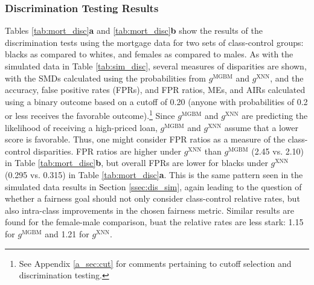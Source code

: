 \documentclass[information,article,submit,moreauthors,pdftex]{definitions/mdpi}
\begin{document}
\subsubsection{Discrimination Testing Results}\label{ssec:dis_mort}

Tables \ref{tab:mort_disc}\textbf{a} and \ref{tab:mort_disc}\textbf{b} show the results of the discrimination tests using the mortgage data for two sets of class-control groups: blacks as compared to whites, and females as compared to males. As with the simulated data in Table \ref{tab:sim_disc}, several measures of disparities are shown, with the SMDs calculated using the probabilities from $g^{\text{MGBM}}$ and $g^{\text{XNN}}$, and the accuracy, false positive rates (FPRs), and  FPR ratios, MEs, and AIRs calculated using a binary outcome based on a cutoff of 0.20 (anyone with probabilities of 0.2 or less receives the favorable outcome).\footnote{See Appendix \ref{a_sec:cut} for comments pertaining to cutoff selection and discrimination testing.} Since $g^{\text{MGBM}}$ and $g^{\text{XNN}}$  are predicting the likelihood of receiving a high-priced loan, $g^{\text{MGBM}}$ and $g^{\text{XNN}}$ assume that a lower score is favorable.  Thus, one might consider FPR ratios as a measure of the class-control disparities. FPR ratios are higher under $g^{\text{XNN}}$ than $g^{\text{MGBM}}$ (2.45 vs. 2.10) in Table \ref{tab:mort_disc}\textbf{b}, but overall FPRs are lower for blacks under $g^{\text{XNN}}$ (0.295 vs. 0.315) in Table \ref{tab:mort_disc}\textbf{a}.  This is the same pattern seen in the simulated data results in Section \ref{ssec:dis_sim}, again leading to the question of whether a fairness goal should not only consider class-control relative rates, but also intra-class improvements in the chosen fairness metric.  Similar results are found for the female-male comparison, buat the relative rates are less stark: 1.15 for $g^{\text{MGBM}}$ and 1.21 for $g^{\text{XNN}}$.
\end{document}
